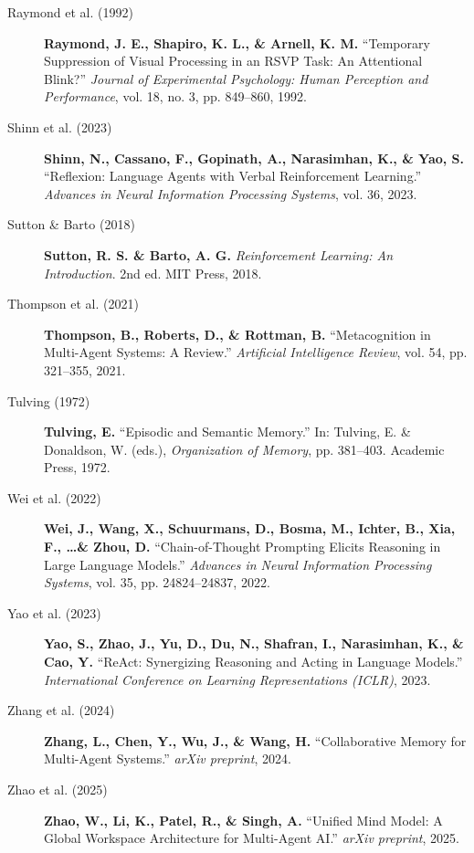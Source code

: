 \begin{description}
    \item[Raymond et al. (1992)] \textbf{Raymond, J. E., Shapiro, K. L., \& Arnell, K. M.} ``Temporary Suppression of Visual Processing in an RSVP Task: An Attentional Blink?'' \textit{Journal of Experimental Psychology: Human Perception and Performance}, vol. 18, no. 3, pp. 849--860, 1992. 
    
    \item[Shinn et al. (2023)] \textbf{Shinn, N., Cassano, F., Gopinath, A., Narasimhan, K., \& Yao, S.} ``Reflexion: Language Agents with Verbal Reinforcement Learning.'' \textit{Advances in Neural Information Processing Systems}, vol. 36, 2023. 
    
    \item[Sutton \& Barto (2018)] \textbf{Sutton, R. S. \& Barto, A. G.} \textit{Reinforcement Learning: An Introduction}. 2nd ed. MIT Press, 2018. 
    
    \item[Thompson et al. (2021)] \textbf{Thompson, B., Roberts, D., \& Rottman, B.} ``Metacognition in Multi-Agent Systems: A Review.'' \textit{Artificial Intelligence Review}, vol. 54, pp. 321--355, 2021. 
    
    \item[Tulving (1972)] \textbf{Tulving, E.} ``Episodic and Semantic Memory.'' In: Tulving, E. \& Donaldson, W. (eds.), \textit{Organization of Memory}, pp. 381--403. Academic Press, 1972. 
    
    \item[Wei et al. (2022)] \textbf{Wei, J., Wang, X., Schuurmans, D., Bosma, M., Ichter, B., Xia, F., \dots \& Zhou, D.} ``Chain-of-Thought Prompting Elicits Reasoning in Large Language Models.'' \textit{Advances in Neural Information Processing Systems}, vol. 35, pp. 24824--24837, 2022. 
    
    \item[Yao et al. (2023)] \textbf{Yao, S., Zhao, J., Yu, D., Du, N., Shafran, I., Narasimhan, K., \& Cao, Y.} ``ReAct: Synergizing Reasoning and Acting in Language Models.'' \textit{International Conference on Learning Representations (ICLR)}, 2023. 
    
    \item[Zhang et al. (2024)] \textbf{Zhang, L., Chen, Y., Wu, J., \& Wang, H.} ``Collaborative Memory for Multi-Agent Systems.'' \textit{arXiv preprint}, 2024. 
    
    \item[Zhao et al. (2025)] \textbf{Zhao, W., Li, K., Patel, R., \& Singh, A.} ``Unified Mind Model: A Global Workspace Architecture for Multi-Agent AI.'' \textit{arXiv preprint}, 2025. 

\end{description}

